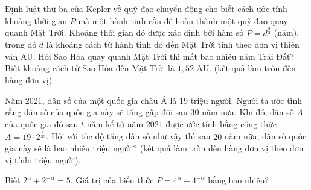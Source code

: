 \begin{ex}%
	Định luật thứ ba của Kepler về quỹ đạo chuyển động cho biết cách ước tính khoảng thời gian $P$ mà một hành tinh cần để hoàn thành một quỹ đạo quay quanh Mặt Trời. Khoảng thời gian đó được xác định bởi hàm số $P=d^{\tfrac{3}{2}}$ (năm), trong đó $d$ là khoảng cách từ hành tinh đó đến Mặt Trời tính theo đơn vị thiên văn AU. Hỏi Sao Hỏa quay quanh Mặt Trời thì mất bao nhiêu năm Trái Đất?  Biết khoảng cách từ Sao Hỏa đến Mặt Trời là $1{,}52$ AU. (kết quả làm tròn đến hàng đơn vị)
\end{ex}

\begin{ex}%
	Năm $2021$, dân số của một quốc gia châu Á là $19$ triệu người. Người ta ước tình rằng dân số của quốc gia này sẽ tăng gấp đôi sau $30$ năm nữa. Khi đó, dân số $A$ của quốc gia đó sau $t$ năm kể từ năm $2021$ được ước tính bằng công thức $A=19\cdot 2^{\tfrac{t}{30}}$. Hỏi với tốc độ tăng dân số như vậy thì sau $20$ năm nữa, dân số  quốc gia này sẽ là bao nhiêu triệu người? (kết quả làm tròn đến hàng đơn vị theo đơn vị tính: triệu người).
\end{ex}

\begin{ex}%
	Biết $2^\alpha+2^{-\alpha}=5$. Giá trị của biểu  thức $P=4^\alpha+4^{-\alpha}$ bằng bao nhiêu?
\end{ex}


